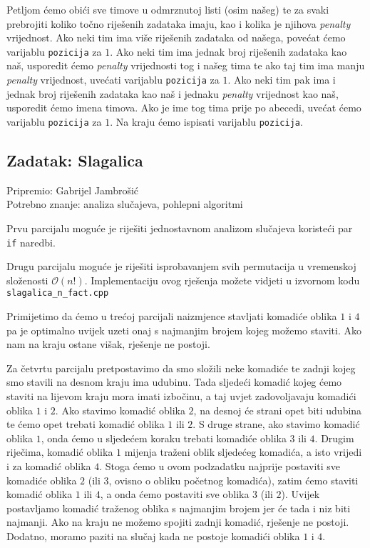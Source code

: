 \documentclass[a4paper]{article}
\begin{document}
Petljom ćemo obići sve timove u odmrznutoj listi (osim našeg) te za svaki
prebrojiti koliko točno riješenih zadataka imaju, kao i kolika je njihova
\textit{penalty} vrijednost. Ako neki tim ima više riješenih zadataka od
našega, povećat ćemo varijablu \texttt{pozicija} za $1$. Ako neki tim ima
jednak broj riješenih zadataka kao naš, usporedit ćemo \textit{penalty}
vrijednosti tog i našeg tima te ako taj tim ima manju \textit{penalty}
vrijednost, uvećati varijablu \texttt{pozicija} za $1$. Ako neki tim pak ima i
jednak broj riješenih zadataka kao naš i jednaku \textit{penalty} vrijednost
kao naš, usporedit ćemo imena timova. Ako je ime tog tima prije po abecedi,
uvećat ćemo varijablu \texttt{pozicija} za $1$. Na kraju ćemo ispisati
varijablu \texttt{pozicija}.

\subsection*{Zadatak: Slagalica}
\textsf{Pripremio: Gabrijel Jambrošić}\\
\textsf{Potrebno znanje: analiza slučajeva, pohlepni algoritmi}

Prvu parcijalu moguće je riješiti jednostavnom analizom slučajeva koristeći par
\texttt{if} naredbi.

Drugu parcijalu moguće je riješiti isprobavanjem svih permutacija u vremenskoj
složenosti $\mathcal{O}(n!)$. Implementaciju ovog rješenja možete vidjeti u
izvornom kodu \texttt{slagalica\_n\_fact.cpp}

Primijetimo da ćemo u trećoj parcijali naizmjence stavljati komadiće oblika $1$
i $4$ pa je optimalno uvijek uzeti onaj s najmanjim brojem kojeg možemo staviti.
Ako nam na kraju ostane višak, rješenje ne postoji.

Za četvrtu parcijalu pretpostavimo da smo složili neke komadiće te zadnji kojeg
smo stavili na desnom kraju ima udubinu. Tada sljedeći komadić kojeg ćemo
staviti na lijevom kraju mora imati izbočinu, a taj uvjet zadovoljavaju
komadići oblika $1$ i $2$. Ako stavimo komadić oblika $2$, na desnoj će strani
opet biti udubina te ćemo opet trebati komadić oblika $1$ ili $2$. S druge
strane, ako stavimo komadić oblika $1$, onda ćemo u sljedećem koraku trebati
komadiće oblika $3$ ili $4$. Drugim riječima, komadić oblika $1$ mijenja
traženi oblik sljedećeg komadića, a isto vrijedi i za komadić oblika $4$. Stoga
ćemo u ovom podzadatku najprije postaviti sve komadiće oblika $2$ (ili $3$,
ovisno o obliku početnog komadića), zatim ćemo staviti komadić oblika $1$ ili
$4$, a onda ćemo postaviti sve oblika $3$ (ili $2$). Uvijek postavljamo komadić
traženog oblika s najmanjim brojem jer će tada i niz biti najmanji. Ako na
kraju ne možemo spojiti zadnji komadić, rješenje ne postoji. Dodatno, moramo
paziti na slučaj kada ne postoje komadići oblika $1$ i $4$.
\end{document}
